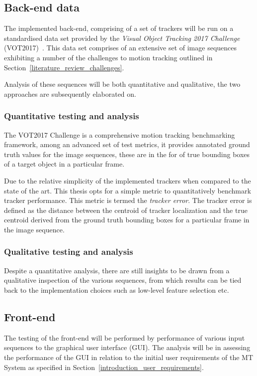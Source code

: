 \subsection{Back-end data}
The implemented back-end, comprising of a set of trackers will be run on a
standardised data set provided by the \textit{Visual Object Tracking 2017
Challenge} (VOT2017)~\cite{VOT2017}. This data set comprises of an extensive set of image
sequences exhibiting a number of the challenges to motion tracking outlined in
Section~\ref{literature_review_challenges}. 

Analysis of these sequences will be both quantitative and qualitative, the two
approaches are subsequently elaborated on.

\subsubsection{Quantitative testing and analysis}
The VOT2017 Challenge is a comprehensive motion tracking benchmarking framework,
among an advanced set of test metrics, it provides annotated ground truth values for the
image sequences, these are in the for of true bounding boxes of a target object in a
particular frame. 

Due to the relative simplicity of the implemented trackers when compared to the
state of the art. This thesis opts for a simple metric to quantitatively
benchmark tracker performance. This metric is termed the \textit{tracker
error}.
The tracker error is defined as the distance between the centroid of tracker
localization and the true centroid derived from the ground truth bounding boxes
for a particular frame in the image sequence.

\subsubsection{Qualitative testing and analysis}
Despite a quantitative analysis, there are still insights to be drawn from a
qualitative inspection of the various sequences, from which results can be tied
back to the implementation choices such as low-level feature selection etc.

\subsection{Front-end}
The testing of the front-end will be performed by performance of various input
sequences to the graphical user interface (GUI). The analysis will be in assessing the
performance of the GUI in relation to the initial user requirements of the MT
System as specified in Section~\ref{introduction_user_requirements}.


